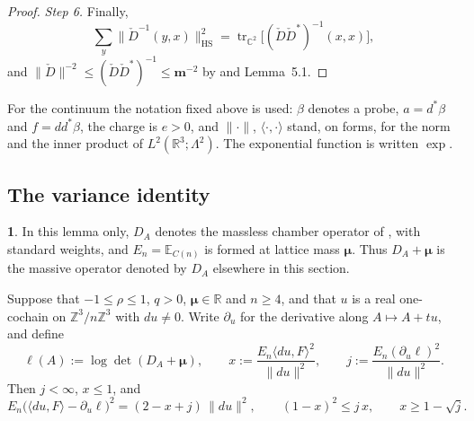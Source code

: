 \documentclass[11pt]{amsart}
\newcommand{\namedhead}{}
\theoremstyle{definition}
\newtheorem*{namedinner}{\namedhead}
\newenvironment{named}[1]{\renewcommand{\namedhead}{#1}\begin{namedinner}}{\end{namedinner}}
\begin{document}
\begin{proof}
\emph{Step 6.}
Finally,
\begin{equation*}
\sum_y\|\check D^{-1}(y,x)\|_{\mathrm{HS}}^2=\operatorname{tr}_{\mathbb C^2}\bigl[(\check D\check D^*)^{-1}(x,x)\bigr],
\end{equation*}
and $\|\check D\|^{-2}\le(\check D\check D^*)^{-1}\le\mathbf m^{-2}$ by \cite[Proposition~3.18\,(c)]{QEDII} and Lemma~5.1.
\end{proof}

For the continuum the notation fixed above is used: $\beta$ denotes a probe, $a=d^*\beta$ and $f=dd^*\beta$, the charge is $e>0$, and $\|\cdot\|$, $\langle\cdot,\cdot\rangle$ stand, on forms, for the norm and the inner product of $L^2(\mathbb R^3;\Lambda^2)$.
The exponential function is written $\exp$.

\subsection{The variance identity}

\begin{named}{Lemma 5.5}
In this lemma only, $D_A$ denotes the massless chamber operator of
\cite[(I.2.3)]{QEDIII}, with standard weights, and $E_n=\mathbb E_{C(n)}$ is formed at
lattice mass $\boldsymbol\mu$. Thus $D_A+\boldsymbol\mu$ is the
massive operator denoted by $D_A$ elsewhere in this section.

Suppose that $-1\le\rho\le1$, $q>0$, $\boldsymbol\mu\in\mathbb R$ and $n\ge4$, and that $u$ is a real one-cochain on $\mathbb Z^3/n\mathbb Z^3$ with $du\ne0$.
Write $\partial_u$ for the derivative along $A\mapsto A+tu$, and define
\begin{equation*}
\ell(A):=\log\det(D_A+\boldsymbol\mu),\qquad x:=\frac{E_n\langle du,F\rangle^2}{\|du\|^2},\qquad j:=\frac{E_n(\partial_u\ell)^2}{\|du\|^2}.
\end{equation*}
Then $j<\infty$, $x\le1$, and
\begin{equation*}
E_n\bigl(\langle du,F\rangle-\partial_u\ell\bigr)^2=(2-x+j)\,\|du\|^2,\qquad(1-x)^2\le j\,x,\qquad x\ge1-\sqrt j .
\end{equation*}
\end{named}
\end{document}
